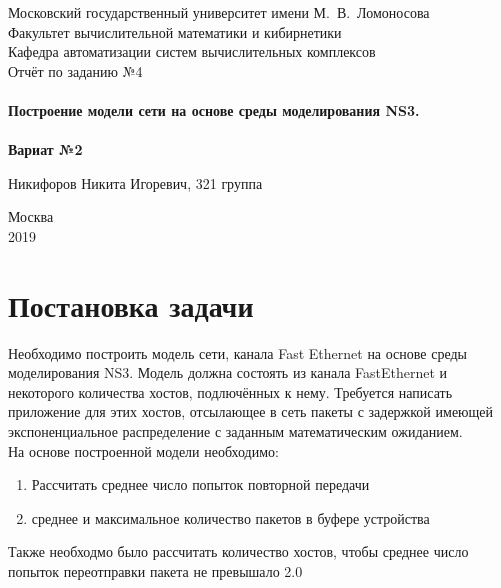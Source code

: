 \documentclass[a4peper, 12pt, titlepage, finall]{extreport}
\begin{document}
    \begin{titlepage}
        \begin{center}
            {\small \sc Московский государственный университет имени М.~В.~Ломоносова\\
            Факультет вычислительной математики и кибирнетики\\
            Кафедра автоматизации систем вычислительных комплексов\\}
            \vfill
            {\large \sc Отчёт по заданию №4}\\~\\

            {\large \bf Построение модели сети на основе среды моделирования NS3.}\\~\\

            {\large \bf Вариат №2}
        \end{center}
        
        \begin{flushright}
            \vfill
            {Никифоров Никита Игоревич, 321 группа}
        \end{flushright}

        \begin{center}
            \vfill
            {\small Москва\\2019}
        \end{center}
    \end{titlepage}

    \tableofcontents
    \newpage

    \section{Постановка задачи}
        Необходимо построить модель сети, канала Fast Ethernet на основе среды моделирования NS3. 
        Модель должна состоять из канала FastEthernet и некоторого количества хостов, подлючённых к нему.
        Требуется написать приложение для этих хостов, отсылающее в сеть пакеты с задержкой имеющей экспоненциальное распределение
        с заданным математическим ожиданием.\\
        На основе построенной модели необходимо:
        \begin{enumerate}
            \item Рассчитать среднее число попыток повторной передачи
            \item среднее и максимальное количество пакетов в буфере устройства
        \end{enumerate}
        Также необходмо было рассчитать количество хостов, чтобы среднее число попыток переотправки пакета не превышало 2.0
\end{document}
